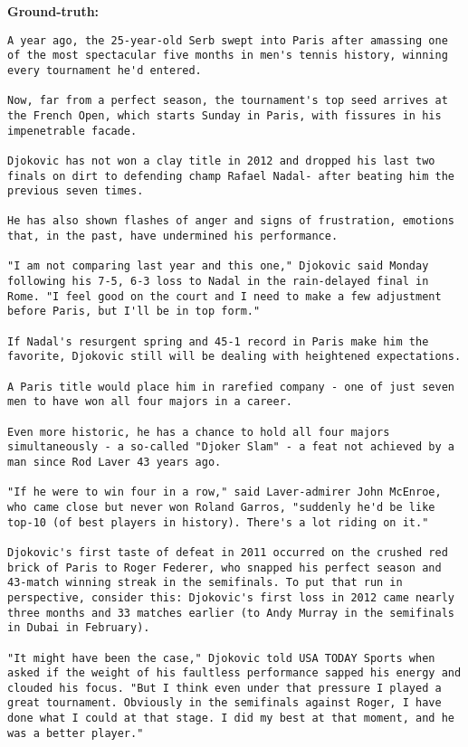 {\bf\ttfamily Ground-truth: }
\begin{lstlisting}
A year ago, the 25-year-old Serb swept into Paris after amassing one of the most spectacular five months in men's tennis history, winning every tournament he'd entered.

Now, far from a perfect season, the tournament's top seed arrives at the French Open, which starts Sunday in Paris, with fissures in his impenetrable facade.

Djokovic has not won a clay title in 2012 and dropped his last two finals on dirt to defending champ Rafael Nadal- after beating him the previous seven times.

He has also shown flashes of anger and signs of frustration, emotions that, in the past, have undermined his performance.

"I am not comparing last year and this one," Djokovic said Monday following his 7-5, 6-3 loss to Nadal in the rain-delayed final in Rome. "I feel good on the court and I need to make a few adjustment before Paris, but I'll be in top form."

If Nadal's resurgent spring and 45-1 record in Paris make him the favorite, Djokovic still will be dealing with heightened expectations.

A Paris title would place him in rarefied company - one of just seven men to have won all four majors in a career.

Even more historic, he has a chance to hold all four majors simultaneously - a so-called "Djoker Slam" - a feat not achieved by a man since Rod Laver 43 years ago.

"If he were to win four in a row," said Laver-admirer John McEnroe, who came close but never won Roland Garros, "suddenly he'd be like top-10 (of best players in history). There's a lot riding on it."

Djokovic's first taste of defeat in 2011 occurred on the crushed red brick of Paris to Roger Federer, who snapped his perfect season and 43-match winning streak in the semifinals. To put that run in perspective, consider this: Djokovic's first loss in 2012 came nearly three months and 33 matches earlier (to Andy Murray in the semifinals in Dubai in February).

"It might have been the case," Djokovic told USA TODAY Sports when asked if the weight of his faultless performance sapped his energy and clouded his focus. "But I think even under that pressure I played a great tournament. Obviously in the semifinals against Roger, I have done what I could at that stage. I did my best at that moment, and he was a better player."


\end{lstlisting}
